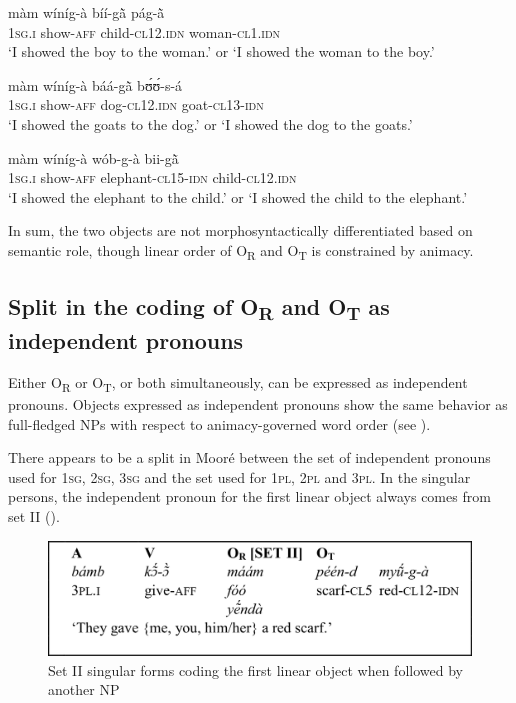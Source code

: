 \documentclass[output=paper]{langsci/langscibook}
\begin{document}
\ea
\label{ex:16.pacchiarotti}
\gll màm    wíníg-à    bíí-g\`{ã}      pág-\`{ã} \\
\textsc{1sg.i}    show-\textsc{aff}    child-\textsc{cl12.idn}  woman-\textsc{cl1.idn}\\
\glt`I showed the boy to the woman.' or `I showed the woman to the boy.'
\z

\ea
\label{ex:17.pacchiarotti}
\gll màm    wíníg-à    báá-g\`{ã}    bʊ́ʊ́-s-á \\
\textsc{1sg.i}    show-\textsc{aff}    dog-\textsc{cl12.idn}  goat-\textsc{cl13-idn}\\
\glt`I showed the goats to the dog.' or `I showed the dog to the goats.'  
\z

\ea
\label{ex:18.pacchiarotti}
\gll màm    wíníg-à    wób-g-à    bii-g\`{ã} \\
\textsc{1sg.i}    show-\textsc{aff}    elephant-\textsc{cl15-idn}  child-\textsc{cl12.idn}\\
\glt `I showed the elephant to the child.' or `I showed the child to the elephant.'
\z

In sum, the two objects are not morphosyntactically differentiated based on semantic role, though linear order of O\textsubscript{R} and O\textsubscript{T} is constrained by animacy.

\subsection{Split in the coding of O\textsubscript{R} and O\textsubscript{T} as independent pronouns}\label{§4.3:split.pacchiarotti}

Either O\textsubscript{R} or O\textsubscript{T}, or both simultaneously, can be expressed as independent pronouns. Objects expressed as independent pronouns show the same behavior as full-fledged NPs with respect to animacy-governed word order (see ). 

There appears to be a split in Mooré between the set of independent pronouns used for 1\textsc{sg}, 2\textsc{sg}, 3\textsc{sg} and the set used for 1\textsc{pl}, 2\textsc{pl} and 3\textsc{pl}. In the singular persons, the independent pronoun for the first linear object always comes from set II (). 

\begin{figure}[h]
\includegraphics[width=\textwidth]{figures/pacchiarottifig1}
\caption{Set II singular forms coding the first linear object when followed by another NP}
\label{fig:1.pacchiarotti}
\end{figure}
\end{document}
